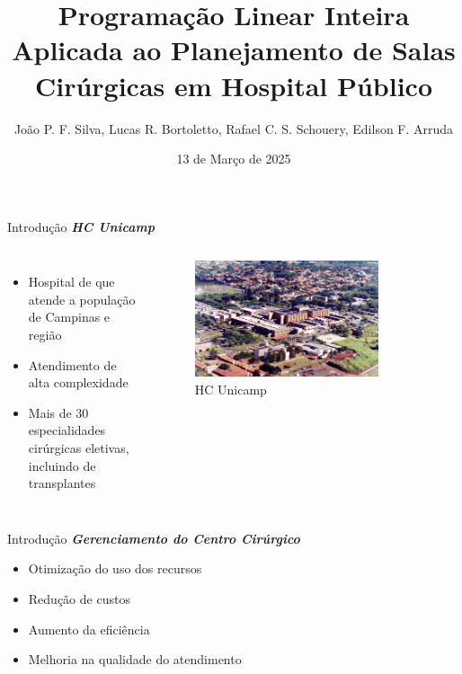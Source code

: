 \documentclass[10pt]{beamer}
\title{Programação Linear Inteira Aplicada ao Planejamento de Salas Cirúrgicas em Hospital Público}
\subtitle{João P. F. Silva, Lucas R. Bortoletto, Rafael C. S. Schouery, Edilson F. Arruda}
\date{13 de Março de 2025}
\begin{document}
\maketitle

\begin{frame}{Introdução}
    \textbf{\textit{HC Unicamp}}
    \begin{columns}
        \begin{itemize}
            \setlength\itemsep{1em}
            \item Hospital de que atende a população de Campinas e região
            \item Atendimento de alta complexidade
            \item Mais de 30 especialidades cirúrgicas eletivas, incluindo de transplantes
        \end{itemize}
        \begin{figure}
            \centering
            \includegraphics[width=0.8\textwidth]{images/aereahc.jpg}
            \caption{HC Unicamp}
        \end{figure}
    \end{columns}
\end{frame}


\begin{frame}{Introdução}
    \textbf{\textit{Gerenciamento do Centro Cirúrgico}}
    \begin{itemize}
        \setlength\itemsep{1em}
        \item Otimização do uso dos recursos
        \item Redução de custos
        \item Aumento da eficiência
        \item Melhoria na qualidade do atendimento
    \end{itemize}
\end{frame}
\end{document}
